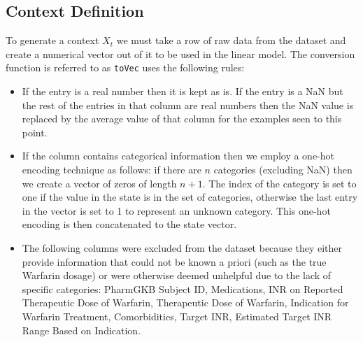 \documentclass{article}
\begin{document}
\subsection{Context Definition}
To generate a context $X_t$ we must take a row of raw data from the dataset and create a numerical vector out of it to be used in the linear model. The conversion function is referred to as \verb|toVec| uses the following rules:

\begin{itemize}
    \item If the entry is a real number then it is kept as is. If the entry is a NaN but the rest of the entries in that column are real numbers then the NaN value is replaced by the average value of that column for the examples seen to this point.
    \item If the column contains categorical information then we employ a one-hot encoding technique as follows: if there are $n$ categories (excluding NaN) then we create a vector of zeros of length $n+1$. The index of the category is set to one if the value in the state is in the set of categories, otherwise the last entry in the vector is set to 1 to represent an unknown category. This one-hot encoding is then concatenated to the state vector.
    \item The following columns were excluded from the dataset because they either provide information that could not be known a priori (such as the true Warfarin dosage) or were otherwise deemed unhelpful due to the lack of specific categories: PharmGKB Subject ID, Medications, INR on Reported Therapeutic Dose of Warfarin, Therapeutic Dose of Warfarin, Indication for Warfarin Treatment, Comorbidities, Target INR, Estimated Target INR Range Based on Indication. 
\end{itemize}
\end{document}
